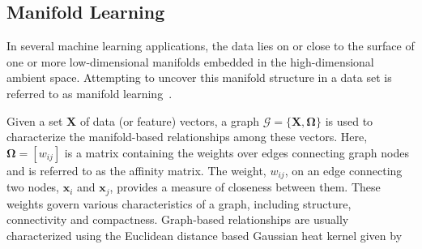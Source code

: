 \documentclass[10pt,twocolumn,letterpaper]{article}
\begin{document}
\subsection{Manifold Learning}
In several machine learning applications, the data lies on or close to the surface of one or more low-dimensional manifolds embedded in the high-dimensional ambient space. 
Attempting to uncover this manifold structure in a data set is referred to as manifold learning~\cite{belkin2006manifold}. 

Given a set $\mathbf{X}$ of data (or feature) vectors, a graph $\mathcal{G}=\{\mathbf{X},\mathbf{\Omega}\}$
is used to characterize the manifold-based relationships among these vectors. Here, $\mathbf{\Omega}=[w_{ij}]$
is  a  matrix  containing  the
weights over edges connecting graph nodes and is referred to as
the affinity matrix. The weight, $w_{ij}$, on an edge connecting two
nodes,
$\mathbf{x}_i$
and
$\mathbf{x}_j$, provides a measure of closeness between them. These weights govern various characteristics
of a graph, including structure, connectivity and compactness.
Graph-based relationships are usually characterized using
the Euclidean distance based Gaussian heat kernel given by
\end{document}
